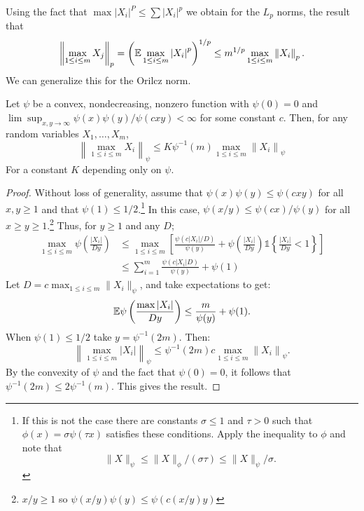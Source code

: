 Using the fact that \(\max|X_i|^P \leq \sum |X_i|^p\) we obtain for the \(L_p\) norms, the result that 
\[
	\left\|\max_{1\leq i\leq m}X_j\right\|_p = \left(\mathbb{E}\max_{1\leq i\leq m}\left|X_i\right|^p\right)^{1/p} \leq m^{1/p}\max_{1\leq i\leq m}\left\|X_i\right\|_p
.\]
We can generalize this for the Orilcz norm.
\begin{lemma}
	\label{lemma:vdv2.2.2}
	Let \(\psi\) be a convex, nondecreasing, nonzero function with  \(\psi(0)=0\) and  \(\lim\sup_{x,y\to\infty}\psi(x)\psi(y)/\psi(cxy)<\infty\) for some constant \(c\). Then, for any random variables  \(X_1,\dots,X_m\),
	\begin{equation}
		\label{eq:vdv2.2.2}
		\left\|\max_{1\leq i\leq m}X_i\right\|_\psi \leq K\psi^{-1}(m)\max_{1\leq i\leq m}\left\|X_i\right\|_\psi
	\end{equation}
	For a constant \(K\) depending only on  \(\psi\).
\end{lemma}

\begin{proof}
	Without loss of generality, assume that  \(\psi(x)\psi(y)\leq \psi(cxy)\) for all \(x,y\geq 1\) and that \(\psi(1)\leq 1/2\).\footnote{If this is not the case there are constants \(\sigma \leq 1\) and \(\tau > 0\) such that  \(\phi(x)=\sigma\psi(\tau x)\) satisfies these conditions. Apply the inequality to  \(\phi\) and note that 
	 \[
		 \|X\|_\psi \leq  \|X\|_\phi/(\sigma\tau)\leq \|X\|_\psi/\sigma
	.\] }
	In this case, \(\psi(x/y)\leq \psi(cx)/\psi(y)\) for all \(x\geq y\geq 1\).\footnote{\(x/y \geq 1\) so \(\psi(x/y)\psi(y) \leq \psi\left(c(x/y)y\right)\)} Thus, for \(y\geq 1\) and any \(D\);
	\begin{align*}
	\max_{1\leq i\leq m}\psi\left(\frac{|X_i|}{Dy}\right) 
	&\leq \max_{1\leq i\leq m}\left[\frac{\psi(c|X_i|/D)}{\psi(y)} + \psi\left(\frac{|X_i|}{Dy}\right)\mathds{1}\left\{\frac{|X_i|}{Dy}<1\right\} \right] \\
	&\leq \sum_{i=1}^m \frac{\psi\left(c|X_i|D\right)}{\psi(y)} + \psi(1) 
	\end{align*}
	Let \(D = c\max_{1\leq i\leq m}\|X_i\|_\psi\), and take expectations to get:
	\[
	    \mathbb{E}\psi\left(\frac{\max|X_i|}{Dy}\right) \leq
		\frac{m}{\psi(y)} + \psi(1) 
	.\] 
	When \(\psi(1)\leq 1/2\) take \(y=\psi^{-1}(2m)\). Then: 
	\[
		\left\|\max_{1\leq i\leq m}\left|X_i\right|\right\|_\psi \leq \psi^{-1}(2m)c\max_{1\leq i\leq m}\left\|X_i\right\|_\psi
	.\] 
	By the convexity of \(\psi\) and the fact that  \(\psi(0)=0\), it follows that  \(\psi^{-1}(2m)\leq 2\psi^{-1}(m)\). This gives the result.
\end{proof}

